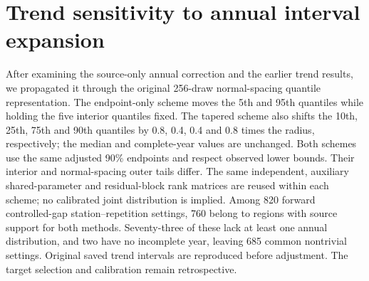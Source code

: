 \section{Trend sensitivity to annual interval expansion}
After examining the source-only annual correction and the earlier trend results, we propagated it through the original 256-draw normal-spacing quantile representation. The endpoint-only scheme moves the 5th and 95th quantiles while holding the five interior quantiles fixed. The tapered scheme also shifts the 10th, 25th, 75th and 90th quantiles by 0.8, 0.4, 0.4 and 0.8 times the radius, respectively; the median and complete-year values are unchanged. Both schemes use the same adjusted 90\% endpoints and respect observed lower bounds. Their interior and normal-spacing outer tails differ. The same independent, auxiliary shared-parameter and residual-block rank matrices are reused within each scheme; no calibrated joint distribution is implied. Among 820 forward controlled-gap station--repetition settings, 760 belong to regions with source support for both methods. Seventy-three of these lack at least one annual distribution, and two have no incomplete year, leaving 685 common nontrivial settings. Original saved trend intervals are reproduced before adjustment. The target selection and calibration remain retrospective.
